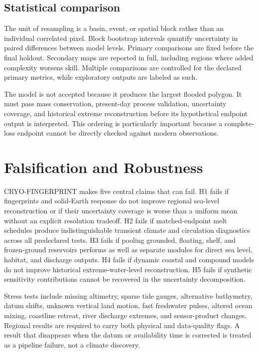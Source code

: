 \documentclass[conference]{IEEEtran}
\begin{document}
\subsection{Statistical comparison}

The unit of resampling is a basin, event, or spatial block rather than an individual correlated pixel. Block bootstrap intervals quantify uncertainty in paired differences between model levels. Primary comparisons are fixed before the final holdout. Secondary maps are reported in full, including regions where added complexity worsens skill. Multiple comparisons are controlled for the declared primary metrics, while exploratory outputs are labeled as such.

The model is not accepted because it produces the largest flooded polygon. It must pass mass conservation, present-day process validation, uncertainty coverage, and historical extreme reconstruction before its hypothetical endpoint output is interpreted. This ordering is particularly important because a complete-loss endpoint cannot be directly checked against modern observations.

\section{Falsification and Robustness}

CRYO-FINGERPRINT makes five central claims that can fail. H1 fails if fingerprints and solid-Earth response do not improve regional sea-level reconstruction or if their uncertainty coverage is worse than a uniform mean without an explicit resolution tradeoff. H2 fails if matched-endpoint melt schedules produce indistinguishable transient climate and circulation diagnostics across all predeclared tests. H3 fails if pooling grounded, floating, shelf, and frozen-ground reservoirs performs as well as separate modules for direct sea level, habitat, and discharge outputs. H4 fails if dynamic coastal and compound models do not improve historical extreme-water-level reconstruction. H5 fails if synthetic sensitivity contributions cannot be recovered in the uncertainty decomposition.

Stress tests include missing altimetry, sparse tide gauges, alternative bathymetry, datum shifts, unknown vertical land motion, fast freshwater pulses, altered ocean mixing, coastline retreat, river discharge extremes, and sensor-product changes. Regional results are required to carry both physical and data-quality flags. A result that disappears when the datum or availability time is corrected is treated as a pipeline failure, not a climate discovery.
\end{document}
